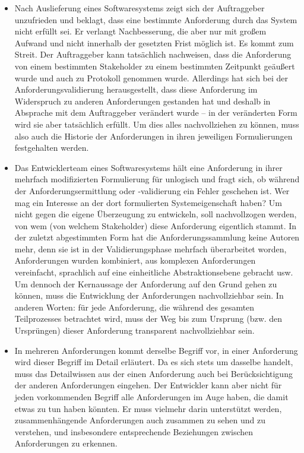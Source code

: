 \begin{itemize}
	\item Nach Auslieferung eines Softwaresystems zeigt sich der Auftraggeber unzufrieden und beklagt, dass eine bestimmte Anforderung durch das System nicht erfüllt sei. Er verlangt Nachbesserung, die aber nur mit großem Aufwand und nicht innerhalb der gesetzten Frist möglich ist. Es kommt zum Streit. Der Auftraggeber kann tatsächlich nachweisen, dass die Anforderung von einem bestimmten Stakeholder zu einem bestimmten Zeitpunkt geäußert wurde und auch zu Protokoll genommen wurde. Allerdings hat sich bei der Anforderungsvalidierung herausgestellt, dass diese Anforderung im Widerspruch zu anderen Anforderungen gestanden hat und deshalb in Absprache mit dem Auftraggeber verändert wurde – in der veränderten Form wird sie aber tatsächlich erfüllt. Um dies alles nachvollziehen zu können, muss also auch die Historie der Anforderungen in ihren jeweiligen Formulierungen festgehalten
	\linebreak %
	werden.

	\vspace{1mm} %

	\item Das Entwicklerteam eines Softwaresystems hält eine Anforderung in ihrer mehrfach modifizierten Formulierung für unlogisch und fragt sich, ob
	\linebreak %
	während der Anforderungsermittlung oder -validierung ein Fehler geschehen ist. Wer mag ein Interesse an der dort formulierten Systemeigenschaft haben? Um nicht gegen die eigene Überzeugung zu entwickeln, soll nachvollzogen werden, von wem (von welchem Stakeholder) diese Anforderung eigentlich stammt. In der zuletzt abgestimmten Form hat die Anforderungssammlung keine Autoren mehr, denn sie ist in der Validierungsphase mehrfach überarbeitet worden, Anforderungen wurden kombiniert, aus komplexen Anforderungen vereinfacht, sprachlich auf eine einheitliche Abstraktionsebene gebracht usw. Um dennoch der Kernaussage der Anforderung auf den Grund gehen zu können, muss die Entwicklung der Anforderungen nachvollziehbar sein. In anderen Worten: für jede Anforderung, die während des gesamten Teilprozesses betrachtet wird, muss der Weg bis zum Ursprung (bzw. den Ursprüngen) dieser Anforderung transparent nachvollziehbar sein.

	\vspace{1mm} %

	\item In mehreren Anforderungen kommt derselbe Begriff vor, in einer Anforderung wird dieser Begriff im Detail erläutert. Da es sich stets um dasselbe handelt, muss das Detailwissen aus der einen Anforderung auch bei Berücksichtigung der anderen Anforderungen eingehen. Der Entwickler kann aber nicht für jeden vorkommenden Begriff alle Anforderungen im Auge haben, die damit etwas zu tun haben könnten. Er muss vielmehr darin unterstützt werden, zusammenhängende Anforderungen auch zusammen zu sehen und zu verstehen, und insbesondere entsprechende Beziehungen zwischen Anforderungen 
	\linebreak %
	zu erkennen.
\end{itemize}

